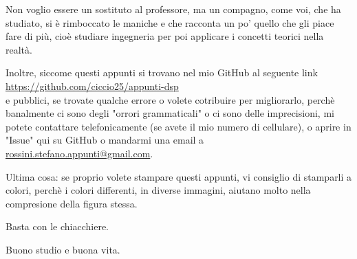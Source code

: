 Non voglio essere un sostituto al professore, ma un compagno, come voi, che ha studiato, si è rimboccato le maniche e che racconta un po' quello che gli piace fare di più, 
cioè studiare ingegneria per poi applicare i concetti teorici nella realtà. \newline 

Inoltre, siccome questi appunti si trovano nel mio GitHub al seguente link \\
\href{https://github.com/ciccio25/appunti-dsp}{https://github.com/ciccio25/appunti-dsp} \\
e pubblici, se trovate qualche errore o volete cotribuire per migliorarlo, perchè banalmente ci sono degli "orrori grammaticali" o ci sono delle imprecisioni, 
mi potete contattare telefonicamente (se avete il mio numero di cellulare), o aprire in "Issue" qui su GitHub o mandarmi una email a \\
\href{mailto:rossini.stefano.appunti@gmail.com}{rossini.stefano.appunti@gmail.com}. \newline 

Ultima cosa: se proprio volete stampare questi appunti, vi consiglio di stamparli a colori, perchè i colori differenti, in diverse immagini, aiutano molto nella compresione della figura stessa. \newline 

Basta con le chiacchiere. \newline 

Buono studio e buona vita. \newline 

\newpage 

